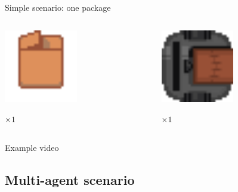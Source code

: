 \begin{frame}{Simple scenario: one package}
    \centering
    \begin{columns}
        \begin{column}{0.5\textwidth}
            \centering
            \includegraphics[width = 0.5\textwidth]{images/godot/package.png}
            
            \LARGE \emph{$\times 1$}
        \end{column}
        \begin{column}{0.5\textwidth}
            \centering
            \includegraphics[width = 0.5\textwidth]{images/godot/robot_texture.png}
            
            \LARGE \emph{$\times 1$}
        \end{column}
    \end{columns}

    Example video
\end{frame}

\subsection{Multi-agent scenario}

